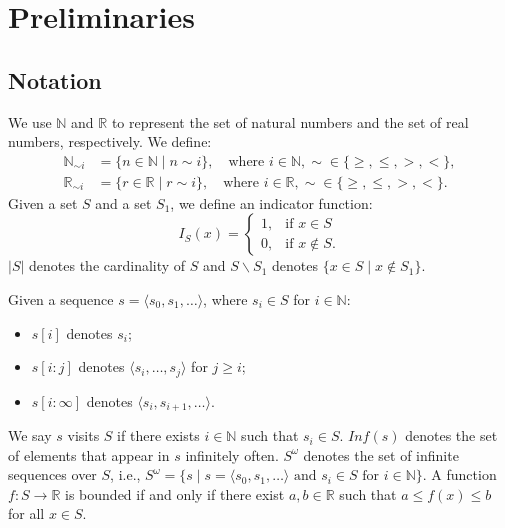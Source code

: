 \section{Preliminaries}
\subsection{Notation}
\label{notation123}
We use \(\mathbb{N}\) and \(\mathbb{R}\) to represent the set of natural numbers and the set of real numbers, respectively. We define:
\begin{align*}
  \mathbb{N}_{\sim i} &= \{n \in \mathbb{N} \mid n \sim i\}, \quad \text{where } i \in \mathbb{N}, \sim \in \{\geq, \leq, >, <\}, \\
  \mathbb{R}_{\sim i} &= \{r \in \mathbb{R} \mid r \sim i\}, \quad \text{where } i \in \mathbb{R}, \sim \in \{\geq, \leq, >, <\}.
\end{align*}
Given a set \( S \) and a set $S_1$, we define an indicator function:
$$I_S(x) =
  \begin{cases}
  1, & \text{if } x \in S \\
  0, & \text{if } x \not\in S.
  \end{cases}$$
$|S|$ denotes the cardinality of $S$ and $S\backslash S_1$ denotes $\{x \in S \mid x \not\in S_1\}$.

Given a sequence \( s = \langle s_0, s_1, \dots \rangle \), where $s_i \in S$ for $i \in \mathbb{N}$:
\begin{itemize}
  \item \( s[i] \) denotes \( s_i \);
  \item \( s[i:j] \) denotes \( \langle s_i, \dots, s_j \rangle \) for \( j \geq i \);
  \item \( s[i:\infty] \) denotes \( \langle s_i, s_{i+1}, \dots \rangle \).
\end{itemize}
We say $s$ visits $S$ if there exists $i \in \mathbb{N}$ such that $s_i \in S$. $Inf(s)$ denotes the set of elements that appear in $s$ infinitely often. $S^{\omega}$ denotes the set of infinite sequences over $S$, i.e., $S^{\omega} = \{s \mid s=\langle s_0, s_1, \dots \rangle \text{ and } s_i \in S \text{ for } i \in \mathbb{N}\}$. A function $f: S \rightarrow \mathbb{R}$ is bounded if and only if there exist $a, b \in \mathbb{R}$ such that $a \leq f(x) \leq b$ for all $x \in S$.

